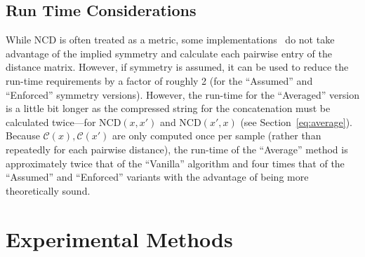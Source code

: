 \documentclass[preprint,12pt]{article}
\begin{document}
\subsection{Run Time Considerations}

While NCD is often treated as a metric, some implementations~\cite{jiang2022less} do not take advantage of the implied symmetry and calculate each pairwise entry of the distance matrix.
However, if symmetry is assumed, it can be used to reduce the run-time requirements by a factor of roughly 2 (for the ``Assumed'' and ``Enforced'' symmetry versions).
However, the run-time for the ``Averaged'' version is a little bit longer as the compressed string for the concatenation must be calculated twice---for $\text{NCD}(x,x')$ and $\text{NCD}(x',x)$ (see Section~\ref{eq:average}).
Because $\mathcal{C}(x), \mathcal{C}(x')$ are only computed once per sample (rather than repeatedly for each pairwise distance), the run-time of the ``Average'' method is approximately twice that of the ``Vanilla'' algorithm and four times that of the ``Assumed'' and ``Enforced'' variants with the advantage of being more theoretically sound.








\section{Experimental Methods}
\label{methods}
\end{document}
